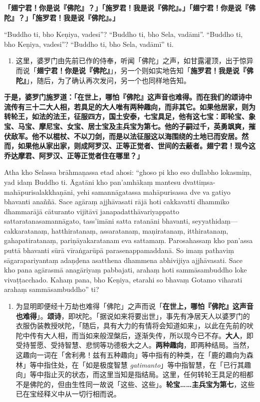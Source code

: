 \textbf{「翅宁君！你是说『佛陀』？」「施罗君！我是说『佛陀』。」「翅宁君！你是说『佛陀』？」「施罗君！我是说『佛陀』。」}

“Buddho ti, bho Keṇiya, vadesi”? “Buddho ti, bho Sela, vadāmi”. “Buddho ti, bho Keṇiya, vadesi”? “Buddho ti, bho Sela, vadāmī” ti.

\begin{enumerate}\item 这里，婆罗门由先前已作的侍奉，听闻「佛陀」之声，如甘露灌顶，出于惊异而说「\textbf{翅宁君！你是说『佛陀』}」，另一个则如实地告知「\textbf{施罗君！我是说『佛陀』}」，随后，为了确认再次发问，另一个也同样地告知。\end{enumerate}

\textbf{于是，婆罗门施罗道：「在世上，哪怕『佛陀』这声音也难得。而在我们的颂诗中流传有三十二大人相，若具足的大人唯有两种趣向，而非其它。如果他居家，则为转轮王，如法的法王，征服四方，国土安泰，七宝具足，他有这七宝：即轮宝、象宝、马宝、摩尼宝、女宝、居士宝及主兵宝为第七。他的子嗣过千，英勇飒爽，摧伏敌军。他不以棍杖、不以刀剑，而是以法征服这以海围绕的土地已而安居。然而，如果他从家出家，则成阿罗汉、正等正觉者、世间的去蔽者。翅宁君！现今这乔达摩君、阿罗汉、正等正觉者住在哪里？」}

Atha kho Selassa brāhmaṇassa etad ahosi: “ghoso pi kho eso dullabho lokasmiṃ, yad idaṃ Buddho ti. Āgatāni kho pan’amhākaṃ mantesu dvattiṃsa-mahāpurisalakkhaṇāni, yehi samannāgatassa mahāpurisassa dve va gatiyo bhavanti anaññā. Sace agāraṃ ajjhāvasati rājā hoti cakkavattī dhammiko dhammarājā cāturanto vijitāvī janapadatthāvariyappatto sattaratanasamannāgato, tass’imāni satta ratanāni bhavanti, seyyathidaṃ— cakkaratanaṃ, hatthiratanaṃ, assaratanaṃ, maṇiratanaṃ, itthiratanaṃ, gahapatiratanaṃ, pariṇāyakaratanam eva sattamaṃ. Parosahassaṃ kho pan’assa puttā bhavanti sūrā vīraṅgarūpā parasenappamaddanā. So imaṃ pathaviṃ sāgarapariyantaṃ adaṇḍena asatthena dhammena abhivijiya ajjhāvasati. Sace kho pana agārasmā anagāriyaṃ pabbajati, arahaṃ hoti sammāsambuddho loke vivaṭṭacchado. Kahaṃ pana, bho Keṇiya, etarahi so bhavaṃ Gotamo viharati arahaṃ sammāsambuddho” ti?

\begin{enumerate}\item 为显明即便经十万劫也难得「佛陀」之声而说「\textbf{在世上，哪怕『佛陀』这声音也难得}」。\textbf{颂诗}，即吠陀。「据说如来将要出世」，事先有净居天人以婆罗门的衣服伪装教授吠陀，「随后，具有大力的有情将会知道如来」，以此在先前的吠陀中传有大人相，而当如来般涅槃后，逐渐失传，所以现今已不存。\textbf{大人}，即受持誓愿、受持智慧、悲悯等功德极大之人。\textbf{两种趣向}，即两种结局。当然，这趣向一词在「舍利弗！兹有五种趣向」等中指有的种类，在「鹿的趣向为森林」等中指住处，在「如是极度智慧 \textit{gatimanto}」等中指智慧，在「已行其趣向」等中指止灭的状态，而这里当知是指结局。这里，任何转轮王具足的相都不是佛陀的，但由生性同一故说「这些、这些」。\textbf{轮宝……主兵宝为第七}，这些已在宝经释义中从一切行相而说。\end{enumerate}

